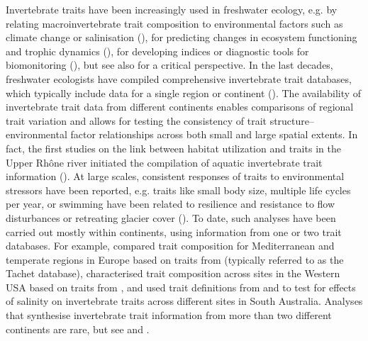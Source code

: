 \documentclass[12pt]{article}
\begin{document}
Invertebrate traits have been increasingly used in freshwater ecology, e.g. by relating macroinvertebrate trait composition to environmental factors such as climate change or salinisation (\cite{bhowmik_large_2015, contiTraitbasedApproachAssess2014, poff_developing_2010, szocs_effects_2014}), for predicting changes in ecosystem functioning and trophic dynamics (\cite{gutierrez-canovasPopulationsHighvaluePredators2021, vos_taxonomic_2017}), for developing indices or diagnostic tools for biomonitoring (\cite{beketov_spear_2009, doledecInvertebrateTraitsBiomonitoring2008a, mondyUsingConditionalTree2013}), but see also \citet{hamiltonLimitationsTraitbasedApproaches2020} for a critical perspective. In the last decades, freshwater ecologists have compiled comprehensive invertebrate trait databases, which typically include data for a single region or continent (\cite{gayraudInvertebrateTraitsBiomonitoring2003, keffordIntegratedDatabaseStream2020a, Philips_and_Smith_NZ_DB_2018, schmidt-kloiber_www.freshwaterecology.info_2015,
statznerConservationTaxonomicBiological2007, tomanova_trophic_2006, ussegliopolatera_biological_2000, vieira_database_nodate}). The availability of invertebrate trait data from different continents enables comparisons of regional trait variation and allows for testing the consistency of trait structure–environmental factor relationships across both small and large spatial extents. In fact, the first studies on the link between habitat utilization and traits in the Upper Rhône river initiated the compilation of aquatic invertebrate trait information (\cite{bournaudApproachSynthesisQualitative1992,usseglio-polateraTheoreticalHabitatTemplets1994}). At large scales, consistent responses of traits to environmental stressors have been reported, e.g. traits like small body size, multiple life cycles per year, or swimming have been related to resilience and resistance to flow disturbances or retreating glacier cover (\cite{bonada_taxonomic_2007, brown_functional_2018}). To date, such analyses have been carried out mostly within continents, using information from one or two trait databases. For example, \citet{bonada_taxonomic_2007} compared trait composition for Mediterranean and temperate regions in Europe based on traits from \citet{ussegliopolatera_biological_2000} (typically referred to as the Tachet database), \citet{poff_developing_2010} characterised trait composition across sites in the Western USA based on traits from \citet{poff_functional_2006}, and \citet{botwe_effects_2018} used trait definitions from \citet{poff_functional_2006} and \citet{schafer_trait_2011} to test for effects of salinity on invertebrate traits across different sites in South Australia. Analyses that synthesise invertebrate trait information from more than two different continents are rare, but see \citet{brown_functional_2018} and \citet{statzner_reproductive_1997}. 
\end{document}
